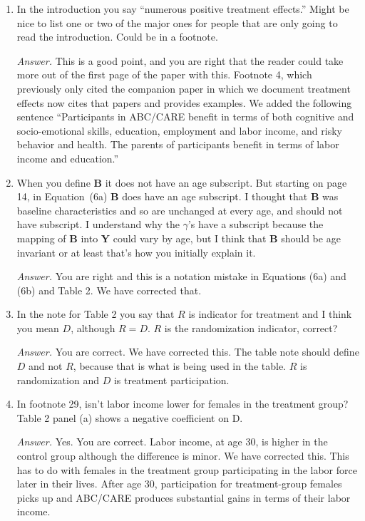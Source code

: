 \begin{enumerate}

\item In the introduction you say ``numerous positive treatment effects.'' Might be nice to list one or two of the major ones for people that are only going to read the introduction. Could be in a footnote. 

\noindent \textit{Answer.} This is a good point, and you are right that the reader could take more out of the first page of the paper with this. Footnote 4, which previously only cited the companion paper in which we document treatment effects now cites that papers and provides examples. We added the following sentence ``Participants in ABC/CARE benefit in terms of both cognitive and socio-emotional skills, education, employment and labor income, and risky behavior and health. The parents of participants benefit in terms of labor income and education.''

\item When you define $\bm{B}$ it does not have an age subscript. But starting on page 14, in Equation~(6a) $\bm{B}$ does have an age subscript. I thought that $\bm{B}$ was baseline characteristics and so are unchanged at every age, and should not have subscript. I understand why the $\gamma$'s have a subscript because the mapping of $\bm{B}$ into $\bm{Y}$ could vary by age, but I think that $\bm{B}$ should be age invariant or at least that's how you initially explain it. 

\noindent \textit{Answer.} You are right and this is a notation mistake in Equations (6a) and (6b) and Table 2. We have corrected that.

\item In the note for Table 2 you say that $R$ is indicator for treatment and I think you mean $D$, although $R=D$.  $R$ is the randomization indicator, correct?

\noindent \textit{Answer.} You are correct. We have corrected this. The table note should define $D$ and not $R$, because that is what is being used in the table. $R$ is randomization and $D$ is treatment participation.

\item In footnote 29, isn't labor income lower for females in the treatment group? Table 2 panel (a) shows a negative coefficient on D.

\noindent \textit{Answer.} Yes. You are correct. Labor income, at age 30, is higher in the control group although the difference is minor. We have corrected this. This has to do with females in the treatment group participating in the labor force later in their lives. After age 30, participation for treatment-group females picks up and ABC/CARE produces substantial gains in terms of their labor income.


\end{enumerate}
